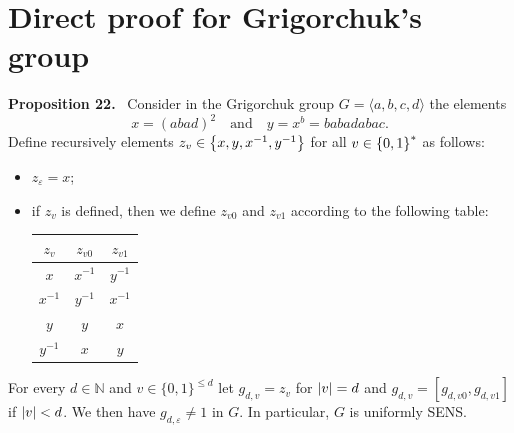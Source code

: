 \documentclass[10pt,a4paper]{article}
\newenvironment{authorclaim}[1]{\par\medskip\noindent\textbf{#1.}\ \ignorespaces}{\par\medskip}
\newcommand{\oneset}[1]{\left\{\mathinner{#1}\right\}}
\newcommand{\abs}[1]{\left|\mathinner{#1}\right|}
\newcommand{\eps}{\varepsilon}
\begin{document}
\section*{Direct proof for Grigorchuk's group}
\begin{authorclaim}{Proposition 22}
  Consider in the Grigorchuk group $G=\langle a,b,c,d\rangle$ the elements
  \[x = (abad)^2\quad \text{and} \quad y = x^b = babadabac.\]
  Define recursively elements $z_v\in\oneset{x,y,x^{-1},y^{-1}}$ for all
  $v\in\oneset{0,1}^*$ as follows:
  \begin{itemize}
  \item $z_\eps = x$;
  \item if $z_v$ is defined, then we define $z_{v0}$ and $z_{v1}$ according to the following table:
   \medskip
  \begin{center}
    \begin{tabular}{|c|c|c|}
      $z_v$ & $z_{v0}$ & $z_{v1}$ \\ \hline 
            $x$ & $x^{-1}$   & $y^{-1}$  \\ \hline
   $x^{-1}$ & $y^{-1}$ & $x^{-1}$  \\ \hline
          $y$ & $y$ & $x$ \\ \hline
  $y^{-1}$ & $x$ & $y$  
   \end{tabular}
 \end{center}
 \medskip
  \end{itemize}
  For every $d\in\mathbb N$  and $v \in \{0,1\}^{\le d}$ let 
  $g_{d,v} = z_v$ for $\abs v = d$ and $g_{d,v} = [g_{d,v0},g_{d,v1}]$ if $\abs v<d$.
  We then have $g_{d,\eps} \neq 1$ in $G$.
  In particular, $G$ is uniformly SENS.
\end{authorclaim}
 
\end{document}

